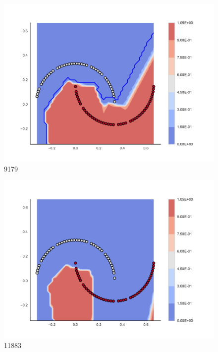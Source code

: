 \begin{subfigure}[b]{0.12\textwidth}
    \includegraphics[clip, trim=2.35cm 1.75cm 4.5cm 0cm,width=\textwidth]{img/convergence/9179.pdf}
    \caption{9179}
    \label{fig:convergence_9179}
\end{subfigure}
%
\begin{subfigure}[b]{0.12\textwidth}
    \includegraphics[clip, trim=2.35cm 1.75cm 4.5cm 0cm,width=\textwidth]{img/convergence/11883.pdf}
    \caption{11883}
    \label{fig:convergence_11883}
\end{subfigure}
%
